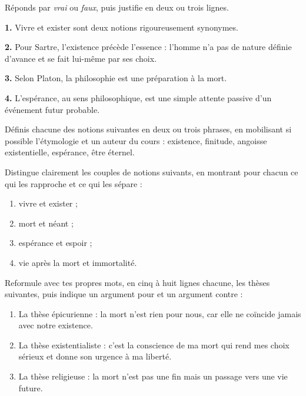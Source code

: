 \documentclass[11pt]{article}
\newcommand{\cle}[1]{{\popxbold\color{popdark}#1}}
\newcounter{popsec}
\newcounter{popsub}
\newcommand{\courssub}[1]{%
  \stepcounter{popsub}%
  \par\vspace{9pt}\noindent{\popxbold\fontsize{11.5}{13}\selectfont\color{popink}{\color{poporange}\thepopsec.\thepopsub}\hspace{6pt}#1}\par\nopagebreak\vspace{4pt}
}
\begin{document}
\begin{exercice}
Réponds par \emph{vrai} ou \emph{faux}, puis justifie en deux ou trois lignes.

\textbf{1.} Vivre et exister sont deux notions rigoureusement synonymes.

\textbf{2.} Pour Sartre, l'existence précède l'essence : l'homme n'a pas de nature définie d'avance et se fait lui-même par ses choix.

\textbf{3.} Selon Platon, la philosophie est une préparation à la mort.

\textbf{4.} L'espérance, au sens philosophique, est une simple attente passive d'un événement futur probable.
\end{exercice}

\begin{exercice}[Définitions]
Définis chacune des notions suivantes en deux ou trois phrases, en mobilisant si possible l'étymologie et un auteur du cours : \cle{existence}, \cle{finitude}, \cle{angoisse existentielle}, \cle{espérance}, \cle{être éternel}.
\end{exercice}

\begin{exercice}
Distingue clairement les couples de notions suivants, en montrant pour chacun ce qui les rapproche et ce qui les sépare :
\begin{enumerate}
\item \cle{vivre} et \cle{exister} ;
\item \cle{mort} et \cle{néant} ;
\item \cle{espérance} et \cle{espoir} ;
\item \cle{vie après la mort} et \cle{immortalité}.
\end{enumerate}
\end{exercice}

\courssub{Je m'entraîne}

\begin{exercice}
Reformule avec tes propres mots, en cinq à huit lignes chacune, les thèses suivantes, puis indique un argument pour et un argument contre :
\begin{enumerate}
\item La thèse épicurienne : la mort n'est rien pour nous, car elle ne coïncide jamais avec notre existence.
\item La thèse existentialiste : c'est la conscience de ma mort qui rend mes choix sérieux et donne son urgence à ma liberté.
\item La thèse religieuse : la mort n'est pas une fin mais un passage vers une vie future.
\end{enumerate}
\end{exercice}
\end{document}
